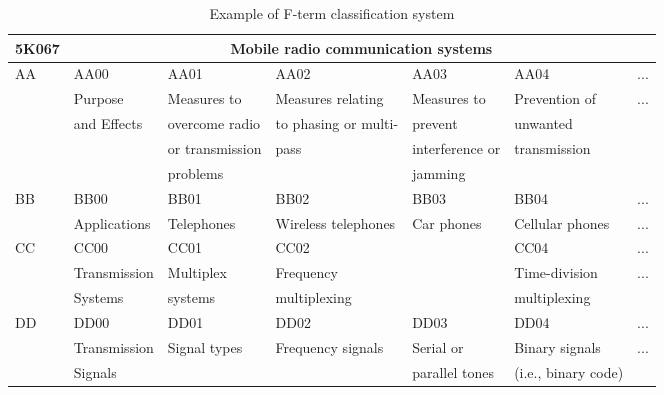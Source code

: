 \documentclass[english]{jnlp_1.2c}
\begin{document}
\begin{table}[b]
\begin{center}
    \footnotesize
\caption{Example of F-term classification system}
\label{tab:t-term-ex}
    \begin{tabular}{|l|l|l|l|l|l|l|} 
\hline
5K067 & \multicolumn{6}{c|}{Mobile radio communication systems} \\
\hline
AA & AA00                & AA01                  & AA02                  & AA03                  & AA04                  & ... \\\cline{2-7}
   & Purpose             & Measures to          & Measures relating   & Measures to         & Prevention of     & ... \\
   & and Effects         & overcome radio        & to phasing or multi-  & prevent               & unwanted              &        \\
   &                     & or transmission       & pass                  & interference or       & transmission          &        \\
   &                     & problems              &                       & jamming               &                       &        \\\hline
BB & BB00                & BB01                  & BB02                  & BB03                  & BB04                  & ... \\\cline{2-7}
   & Applications        & Telephones           & Wireless telephones & Car phones        & Cellular  phones  & ... \\\hline
CC & CC00                & CC01                  & CC02                  &                       & CC04                  & ... \\\cline{2-7}
   & Transmission        & Multiplex            & Frequency           &                       & Time-division      & ... \\
   & Systems             & systems               & multiplexing          &                       & multiplexing          &        \\\hline
DD & DD00                & DD01                  & DD02                  & DD03                  & DD04                  & ... \\\cline{2-7}
   & Transmission        & Signal types         & Frequency signals   & Serial or          & Binary signals     & ... \\
   & Signals             &                       &                       & parallel tones        & (i.e., binary code)   &        \\\hline

\end{tabular}
\end{center}
\end{table}
\end{document}

